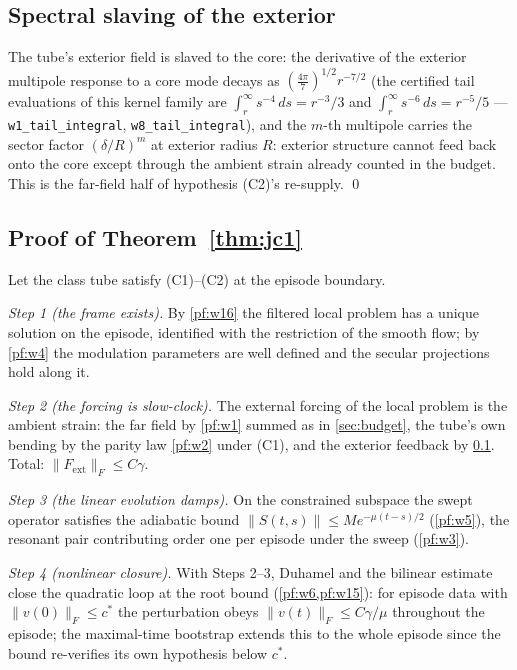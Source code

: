 \documentclass[11pt,letterpaper]{amsart}
\theoremstyle{definition}
\theoremstyle{remark}
\newcommand{\norm}[1]{\lVert #1 \rVert}
\begin{document}
\subsection{Spectral slaving of the exterior}\label{pf:w8}
The tube's exterior field is slaved to the core: the derivative of the exterior
multipole response to a core mode decays as
$(\tfrac{4\pi}{7})^{1/2}r^{-7/2}$ (the certified tail evaluations of this kernel
family are $\int_r^\infty s^{-4}\,ds=r^{-3}/3$ and $\int_r^\infty s^{-6}\,ds=r^{-5}/5$
--- \texttt{w1\_tail\_integral}, \texttt{w8\_tail\_integral}), and the $m$-th multipole carries the sector factor
$(\delta/R)^m$ at exterior radius $R$: exterior structure cannot feed back onto the
core except through the ambient strain already counted in the budget. This is the
far-field half of hypothesis (C2)'s re-supply. \qed

\subsection{Proof of Theorem~\ref{thm:jc1}}\label{pf:jc1}
Let the class tube satisfy (C1)--(C2) at the episode boundary.

\emph{Step 1 (the frame exists).} By \cref{pf:w16} the filtered local problem has a
unique solution on the episode, identified with the restriction of the smooth flow;
by \cref{pf:w4} the modulation parameters are well defined and the secular
projections hold along it.

\emph{Step 2 (the forcing is slow-clock).} The external forcing of the local problem
is the ambient strain: the far field by \cref{pf:w1} summed as in
\cref{sec:budget}, the tube's own bending by the parity law \cref{pf:w2} under (C1),
and the exterior feedback by \cref{pf:w8}. Total: $\norm{F_{\mathrm{ext}}}_F\le
C\gamma$.

\emph{Step 3 (the linear evolution damps).} On the constrained subspace the swept
operator satisfies the adiabatic bound $\norm{S(t,s)}\le Me^{-\mu(t-s)/2}$
(\cref{pf:w5}), the resonant pair contributing order one per episode under the sweep
(\cref{pf:w3}).

\emph{Step 4 (nonlinear closure).} With Steps 2--3, Duhamel and the bilinear estimate
close the quadratic loop at the root bound (\cref{pf:w6,pf:w15}): for episode data
with $\norm{v(0)}_F\le c^*$ the perturbation obeys $\norm{v(t)}_F\le C\gamma/\mu$
throughout the episode; the maximal-time bootstrap extends this to the whole episode
since the bound re-verifies its own hypothesis below $c^*$.
\end{document}

